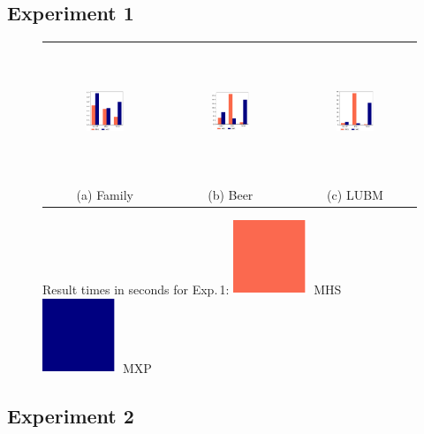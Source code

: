 \documentclass[12pt,a4paper]{article}
\begin{document}
\subsection{Experiment 1}

\begin{figure}[H]
	\noindent
	\begin{tabular}{@{}c@{\ }c@{\ }c@{}}
		\includegraphics[width=0.33\textwidth, height=4cm]{eval1Family} 
		&
		\includegraphics[width=0.33\textwidth, height=4cm]{eval1Beer} 
		&
		\includegraphics[width=0.33\textwidth, height=4cm]{eval1LUBM} 
		\\
		(a) Family & (b) Beer & (c) LUBM \\
	\end{tabular}
	\caption{Result times in seconds for Exp.\,1:\quad
		\protect\includegraphics[width=1.5ex]{cl-mhs}~MHS\quad
		\protect\includegraphics[width=1.5ex]{cl-mxp}~MXP
	}
	\label{fig:eval1}
\end{figure}

\subsection{Experiment 2}
\end{document}
